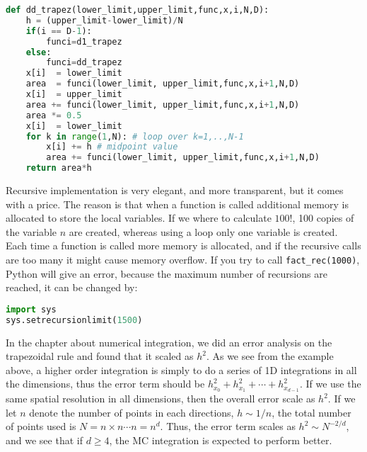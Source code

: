 \documentclass[graybox,sectrefs,envcountresetchap,open=right,final]{svmonodo}
\newenvironment{graybox2admon}[1][]{
\begin{graybox2mdframed}[frametitle=#1]
}
{
\end{graybox2mdframed}
}
\begin{document}
\begin{lstlisting}[language=python,style=blue1]
def dd_trapez(lower_limit,upper_limit,func,x,i,N,D):
    h = (upper_limit-lower_limit)/N
    if(i == D-1):
        funci=d1_trapez
    else:
        funci=dd_trapez
    x[i]  = lower_limit
    area  = funci(lower_limit, upper_limit,func,x,i+1,N,D)
    x[i]  = upper_limit
    area += funci(lower_limit, upper_limit,func,x,i+1,N,D)
    area *= 0.5
    x[i]  = lower_limit
    for k in range(1,N): # loop over k=1,..,N-1
        x[i] += h # midpoint value
        area += funci(lower_limit, upper_limit,func,x,i+1,N,D)
    return area*h

\end{lstlisting}




\begin{graybox2admon}[Recursive functions]
Recursive implementation is very elegant, and more transparent, but it comes with a price. The reason is that when a function is called additional memory is allocated to store the local variables. If we where to calculate $100!$, 100 copies of the variable $n$ are created, whereas using a loop only one variable is created. Each time a function is called more memory is allocated, and if the recursive calls are too many it might cause memory overflow. If you try to call \Verb!fact_rec(1000)!, Python will give an error, because the maximum number of recursions are reached, it can be changed by:



\begin{lstlisting}[language=Python,style=gray]
import sys
sys.setrecursionlimit(1500)

\end{lstlisting}
\end{graybox2admon}






\begin{graybox2admon}[Error Analysis in higher dimensions]
In the chapter about numerical integration, we did an error analysis
on the trapezoidal rule and found that it scaled as $h^2$. As we see
from the example above, a higher order integration is simply to do a
series of 1D integrations in all the dimensions, thus the error term
should be $h_{x_0}^2+h_{x_1}^2+\cdots+h_{x_{d-1}}^2$. If we use the
same spatial resolution in all dimensions, then the overall error
scale as $h^2$. If we let $n$ denote the number of points in each
directions, $h\sim 1/n$, the total number of points used is $N=n\times
n\cdots n=n^d$. Thus, the error term scales as $h^2\sim N^{-2/d}$, and
we see that if $d\geq 4$, the MC integration is expected to perform
better.
\end{graybox2admon}
\end{document}
